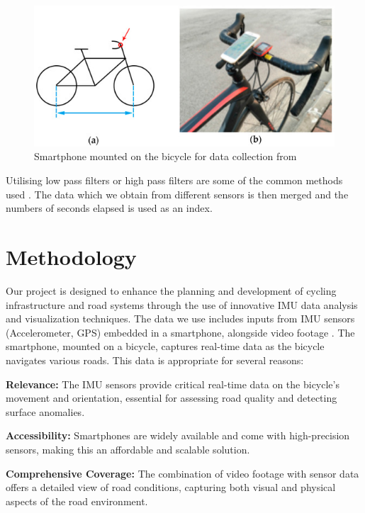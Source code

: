 \documentclass[a4paper,12pt]{Classes/RoboticsLaTeX}
\begin{document}
\begin{abstracts}
 \begin{figure}[H]
\centering
\includegraphics[width=\linewidth]{Figures/position_on_cycle.jpg}
\caption{Smartphone mounted on the bicycle for data collection from \cite{Zang}}
\label{fig:cycle}
\end{figure}

    Utilising low pass filters or high pass filters are some of the common methods used \cite{Sebestyen}. The data which we obtain from different sensors is then merged and the numbers of seconds elapsed is used as an index.

    

 
	\chapter{Methodology}
	\label{chap:methodology} 
	
	Our project is designed to enhance the planning and development of cycling infrastructure and road systems through the use of innovative IMU data analysis and visualization techniques. The data we use includes inputs from IMU sensors (Accelerometer, GPS) embedded in a smartphone, alongside video footage \cite{Zang}. The smartphone, mounted on a bicycle, captures real-time data as the bicycle navigates various roads. This data is appropriate for several reasons:

\textbf{Relevance:} The IMU sensors provide critical real-time data on the bicycle’s movement and orientation, essential for assessing road quality and detecting surface anomalies.
\vspace{10pt}

\textbf{Accessibility:} Smartphones are widely available and come with high-precision sensors, making this an affordable and scalable solution.
\vspace{10pt}

\textbf{Comprehensive Coverage:} The combination of video footage with sensor data offers a detailed view of road conditions, capturing both visual and physical aspects of the road environment.
\vspace{10pt}


\end{abstracts}
\end{document}

